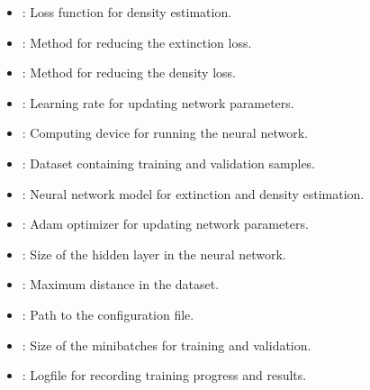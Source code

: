 \documentclass[letterpaper,10pt,english]{sphinxmanual}
\begin{document}
\begin{fulllineitems}
\begin{description}
\begin{itemize}
\item {} 
\sphinxAtStartPar
{}: Loss function for density estimation.

\item {} 
\sphinxAtStartPar
{}: Method for reducing the extinction loss.

\item {} 
\sphinxAtStartPar
{}: Method for reducing the density loss.

\item {} 
\sphinxAtStartPar
{}: Learning rate for updating network parameters.

\item {} 
\sphinxAtStartPar
{}: Computing device for running the neural network.

\item {} 
\sphinxAtStartPar
{}: Dataset containing training and validation samples.

\item {} 
\sphinxAtStartPar
{}: Neural network model for extinction and density estimation.

\item {} 
\sphinxAtStartPar
{}: Adam optimizer for updating network parameters.

\item {} 
\sphinxAtStartPar
{}: Size of the hidden layer in the neural network.

\item {} 
\sphinxAtStartPar
{}: Maximum distance in the dataset.

\item {} 
\sphinxAtStartPar
{}: Path to the configuration file.

\item {} 
\sphinxAtStartPar
{}: Size of the minibatches for training and validation.

\end{itemize}

\begin{itemize}
\item {} 
\sphinxAtStartPar
{}: Logfile for recording training progress and results.


\end{itemize}
\end{description}
\end{fulllineitems}
\end{document}
